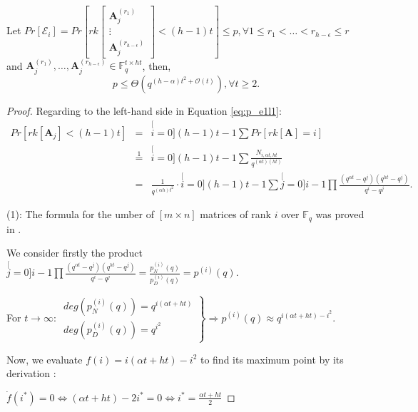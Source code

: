 \begin{lem}
Let $Pr\left[\mathcal{E}_{i}\right]=Pr\left[rk\left[\begin{array}{c}
\boldsymbol{A}_{j}^{\left(r_{1}\right)}\\
\vdots\\
\boldsymbol{A}_{j}^{\left(r_{h-\epsilon}\right)}
\end{array}\right]<(h-1)t\right]\leq p,\forall1\leq r_{1}<\ldots<r_{h-\epsilon}\leq r$ and $\boldsymbol{A}_{j}^{\left(r_{1}\right)},\ldots,\boldsymbol{A}_{j}^{\left(r_{h-\epsilon}\right)}\in\ensuremath{\mathbb{F}}_{q}^{t\times ht}$,
then, 
\[
p\leq\Theta\left(q^{\left(h-\alpha\right)t^{2}+\mathcal{O}(t)}\right),\forall t\geq2.
\]
\end{lem}
\begin{proof}
Regarding to the left-hand side in Equation \ref{eq:p_e1l1}:
\begin{eqnarray}
Pr\left[rk\left[\boldsymbol{A}_{j}\right]<(h-1)t\right] & = & \stackrel[i=0]{(h-1)t-1}{\mathop{\sum}}Pr\left[rk\left[\boldsymbol{A}\right]=i\right]\nonumber \\
 & \overset{1}{=} & \stackrel[i=0]{(h-1)t-1}{\mathop{\sum}}\frac{N_{i,\alpha t,ht}}{q^{\left(\alpha t\right)\left(ht\right)}}\nonumber \\
 & = & \frac{1}{q^{\left(\alpha h\right)t^{2}}}\cdot\stackrel[i=0]{(h-1)t-1}{\mathop{\sum}}\stackrel[j=0]{i-1}{\mathop{\prod}}\frac{\left(q^{\alpha t}-q^{j}\right)\left(q^{ht}-q^{j}\right)}{q^{i}-q^{j}}.\label{eq:general_nw_calc_p}
\end{eqnarray}

(1): The formula for the umber of $\left[m\times n\right]$ matrices
of rank $i$ over $\ensuremath{\mathbb{F}}_{q}$ was proved in \cite{Overbeck:2007}.

We consider firstly the product$\stackrel[j=0]{i-1}{\mathop{\prod}}\frac{\left(q^{\alpha t}-q^{j}\right)\left(q^{ht}-q^{j}\right)}{q^{i}-q^{j}}=\frac{p_{N}^{(i)}(q)}{p_{D}^{(i)}(q)}=p^{(i)}(q)$.

For $t\rightarrow\infty$: $\left.\begin{array}{c}
deg\left(p_{N}^{(i)}(q)\right)=q^{i(\alpha t+ht)}\\
deg\left(p_{D}^{(i)}(q)\right)=q^{i^{2}}
\end{array}\right\} \Rightarrow p^{(i)}(q)\approx q^{i(\alpha t+ht)-i^{2}}.$

Now, we evaluate $f(i)=i(\alpha t+ht)-i^{2}$ to find its maximum
point by its derivation : 

$\dot{f}(i^{*})=0\Leftrightarrow(\alpha t+ht)-2i^{*}=0\Leftrightarrow i^{*}=\frac{\alpha t+ht}{2}$


\end{proof}
